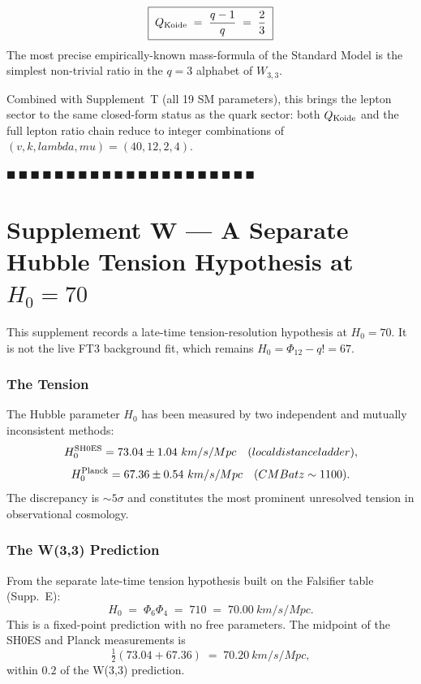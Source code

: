 \documentclass[12pt,a4paper]{article}
\def\text#1{#1}%
\def\lambda{lambda}%
\def\mu{mu}%
\def\Phi#1{Phi#1}%
\def\cdot{ }%
\theoremstyle{definition}
\newcommand{\Phitwelve}{\Phi_{12}}
\begin{document}
\[
\boxed{\;Q_{\rm Koide} \;=\; \frac{q-1}{q} \;=\; \frac{2}{3}\;}
\]
The most precise empirically-known mass-formula of the Standard Model
is the simplest non-trivial ratio in the $q=3$ alphabet of $W_{3,3}$.

Combined with Supplement~T (all 19 SM parameters), this brings the
lepton sector to the same closed-form status as the quark sector:
both $Q_{\rm Koide}$ and the full lepton ratio chain reduce to
integer combinations of $(v,k,\lambda,\mu)=(40,12,2,4)$.

\hfill $\blacksquare\ \blacksquare\ \blacksquare\ \blacksquare\ \blacksquare\ \blacksquare\ \blacksquare\ \blacksquare\ \blacksquare\ \blacksquare\ \blacksquare\ \blacksquare\ \blacksquare\ \blacksquare\ \blacksquare\ \blacksquare\ \blacksquare\ \blacksquare\ \blacksquare\ \blacksquare\ \blacksquare$

\clearpage
\part*{Supplement W --- A Separate Hubble Tension Hypothesis at $H_0 = 70$}

This supplement records a late-time tension-resolution hypothesis at
$H_0=70$. It is not the live FT3 background fit, which remains
$H_0=\Phitwelve-q!=67$.

\section*{The Tension}

The Hubble parameter $H_0$ has been measured by two independent and
mutually inconsistent methods:
\[
H_0^{\rm SH0ES} = 73.04 \pm 1.04\ \text{km/s/Mpc}\quad\text{(local distance ladder)},
\]
\[
H_0^{\rm Planck} = 67.36 \pm 0.54\ \text{km/s/Mpc}\quad\text{(CMB at }z\sim 1100).
\]
The discrepancy is $\sim 5\sigma$ and constitutes the most prominent
unresolved tension in observational cosmology.

\section*{The W(3,3) Prediction}

From the separate late-time tension hypothesis built on the Falsifier
table (Supp.~E):
\[
\boxed{\;H_0 \;=\; \Phi_6\cdot\Phi_4 \;=\; 7\cdot 10 \;=\; 70.00\ \text{km/s/Mpc}.\;}
\]
This is a fixed-point prediction with no free parameters. The
midpoint of the SH0ES and Planck measurements is
\[
\tfrac{1}{2}(73.04 + 67.36) \;=\; 70.20\ \text{km/s/Mpc},
\]
within $0.2$ of the W(3,3) prediction.
\end{document}
